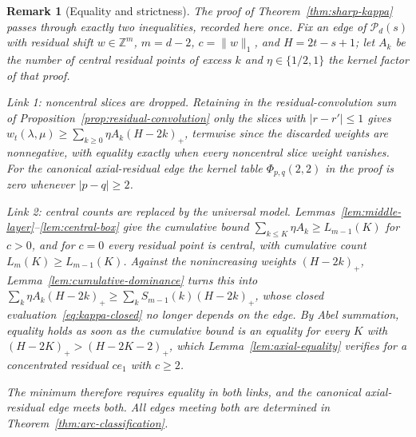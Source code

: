 \documentclass[pdflatex,sn-mathphys-num]{sn-jnl}
\theoremstyle{thmstyleone}
\theoremstyle{thmstylethree}
\theoremstyle{thmstyletwo}
\newtheorem*{namedremark}{Remark}
\newcommand{\Z}{\mathbb Z}
\begin{document}
\begin{namedremark}[Equality and strictness]
The proof of Theorem~\ref{thm:sharp-kappa} passes through exactly two
inequalities, recorded here once.  Fix an edge of $\mathcal P_d(s)$ with
residual shift $w\in\Z^m$, $m=d-2$, $c=\|w\|_1$, and $H=2t-s+1$; let $A_k$ be
the number of central residual points of excess $k$ and $\eta\in\{1/2,1\}$ the
kernel factor of that proof.

\emph{Link 1: noncentral slices are dropped.}  Retaining in the
residual-convolution sum of Proposition~\ref{prop:residual-convolution} only
the slices with $|r-r'|\le1$ gives
$w_t(\lambda,\mu)\ge\sum_{k\ge0}\eta A_k(H-2k)_+$, termwise since the
discarded weights are nonnegative, with equality exactly when every
noncentral slice weight vanishes.  For the canonical axial-residual edge the
kernel table $\Phi_{p,q}(2,2)$ in the proof is zero whenever $|p-q|\ge2$.

\emph{Link 2: central counts are replaced by the universal model.}
Lemmas~\ref{lem:middle-layer}--\ref{lem:central-box} give the cumulative bound
$\sum_{k\le K}\eta A_k\ge L_{m-1}(K)$ for $c>0$, and for $c=0$ every residual
point is central, with cumulative count $L_m(K)\ge L_{m-1}(K)$.  Against the
nonincreasing weights $(H-2k)_+$, Lemma~\ref{lem:cumulative-dominance} turns
this into $\sum_k\eta A_k(H-2k)_+\ge\sum_kS_{m-1}(k)(H-2k)_+$, whose closed
evaluation~\eqref{eq:kappa-closed} no longer depends on the edge.  By Abel
summation, equality holds as soon as the cumulative bound is an equality for
every $K$ with $(H-2K)_+>(H-2K-2)_+$, which
Lemma~\ref{lem:axial-equality} verifies for a concentrated residual $ce_1$
with $c\ge2$.

The minimum therefore requires equality in both links, and the canonical
axial-residual edge meets both.  All edges meeting both are determined in
Theorem~\ref{thm:arc-classification}.
\end{namedremark}
\end{document}
